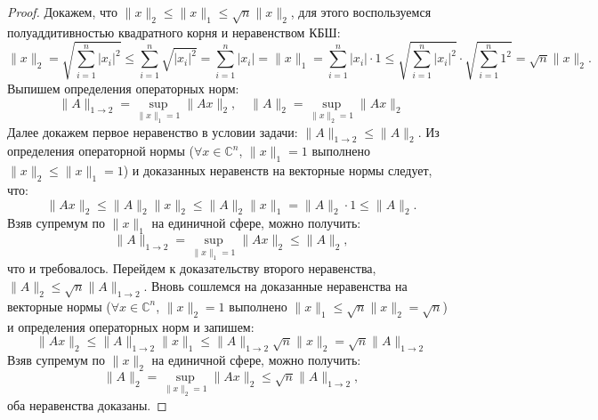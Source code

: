 \documentclass{article}
\newtheorem*{proof}{$\square$}
\renewcommand{\C}{\mathbb{C}}
\renewcommand{\leq}{\leqslant}
\begin{document}
		\begin{proof}		
			Докажем, что $\|x\|_2 \leq \|x\|_1 \leq \sqrt{n}\|x\|_2$, для этого воспользуемся полуаддитивностью квадратного корня и неравенством КБШ:
			\begin{equation*}
				\|x\|_2 = \sqrt{\sum\limits_{i=1}^n |x_i|^2} \leq \sum\limits_{i=1}^n \sqrt{|x_i|^2} = \sum\limits_{i=1}^n |x_i| = \|x\|_1 = \sum\limits_{i=1}^n |x_i| \cdot 1 \leq \sqrt{\sum\limits_{i=1}^n |x_i|^2} \cdot \sqrt{\sum\limits_{i=1}^n 1^2} = \sqrt{n} \|x\|_2.
			\end{equation*}
		    Выпишем определения операторных норм:
			\begin{equation*}
				\|A\|_{1\to2} = \sup\limits_{\|x\|_1=1} \|Ax\|_{2},\quad \|A\|_{2} = \sup\limits_{\|x\|_2=1} \|Ax\|_{2}
			\end{equation*}
			Далее докажем первое неравенство в условии задачи: $\|A\|_{1\to 2} \leq  \|A\|_{2}$. Из определения операторной нормы ($\forall x\in\C^n$, $\|x\|_1=1$ выполнено $\|x\|_2 \leq \|x\|_1=1$) и доказанных неравенств на векторные нормы следует, что:
			\begin{equation*}
				\|Ax\|_2 \leq \|A\|_2 \|x\|_2 \leq \|A\|_2 \|x\|_1 =  \|A\|_2 \cdot 1 \leq  \|A\|_2.
			\end{equation*}
			Взяв супремум по $\|x\|_1$ на единичной сфере, можно получить:
			\begin{equation*}
				\|A\|_{1\to2} = \sup\limits_{\|x\|_1=1} \|Ax\|_2  \leq \|A\|_2,
			\end{equation*}
			что и требовалось. Перейдем к доказательству второго неравенства, $\|A\|_{2} \leq \sqrt{n}\|A\|_{1\to 2}$. Вновь сошлемся на доказанные неравенства на векторные нормы ($\forall x\in\C^n$, $\|x\|_2=1$ выполнено $\|x\|_1 \leq \sqrt{n}\|x\|_2=\sqrt{n}$) и определения операторных норм и запишем:
			\begin{equation*}
				\|Ax\|_2 \leq \|A\|_{1\to2} \|x\|_1 \leq \|A\|_{1\to2} \sqrt{n} \|x\|_2 = \sqrt{n} \|A\|_{1\to2} 
			\end{equation*}
			Взяв супремум по $\|x\|_2$ на единичной сфере, можно получить:
			\begin{equation*}
				\|A\|_{2} = \sup\limits_{\|x\|_2=1} \|Ax\|_2  \leq \sqrt{n}\|A\|_{1\to2},
			\end{equation*}
			оба неравенства доказаны.
			\end{proof}
\end{document}
